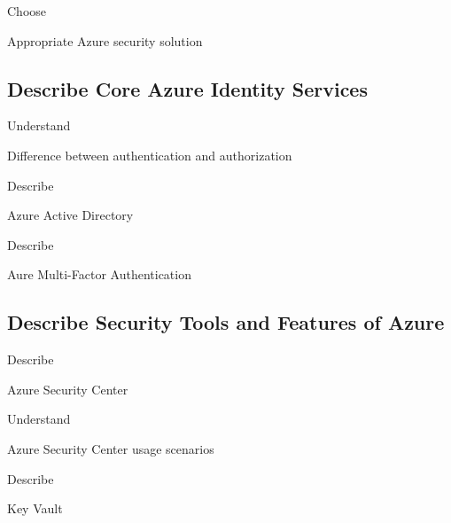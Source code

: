 \documentclass{scrartcl}
\newenvironment{flashcard}[2][]{%
    #1
    \vfill
    \centerline{\Large{#2}}
    \vfill
    \newpage
}
{\newpage}
\newcommand{\subsectioncard}[1]{
    \vspace*{\stretch{1}}
    \subsection{#1}
    \vspace*{\stretch{1}}
    \pagebreak
}
\begin{document}
    \begin{flashcard}[Choose]{Appropriate Azure security solution}

    \end{flashcard}

    \subsectioncard{Describe Core Azure Identity Services}

    \begin{flashcard}[Understand]{Difference between authentication and authorization}

    \end{flashcard}

    \begin{flashcard}[Describe]{Azure Active Directory}

    \end{flashcard}

    \begin{flashcard}[Describe]{Aure Multi-Factor Authentication}

    \end{flashcard}

    \subsectioncard{Describe Security Tools and Features of Azure}

    \begin{flashcard}[Describe]{Azure Security Center}

    \end{flashcard}

    \begin{flashcard}[Understand]{Azure Security Center usage scenarios}

    \end{flashcard}

    \begin{flashcard}[Describe]{Key Vault}

    \end{flashcard}
\end{document}
